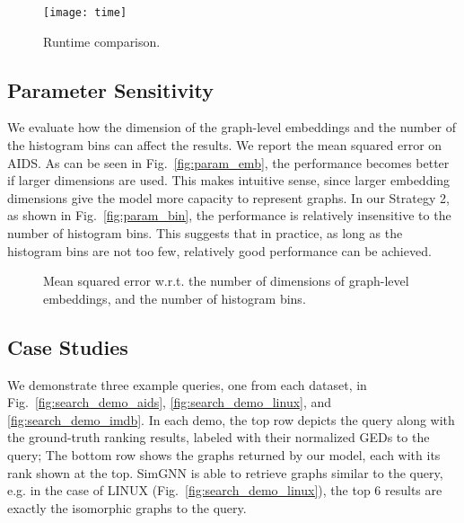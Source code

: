 \documentclass[sigconf]{acmart}
\begin{document}
\begin{figure}
\centering
\texttt{[image: time]}
\vspace{-0.05in}
\caption{Runtime comparison.}
\label{fig:time}
\vspace{-0.05in}
\end{figure}

\subsection{Parameter Sensitivity}

We evaluate how the dimension of the graph-level embeddings and the number of the histogram bins can affect the results. We report the mean squared error on AIDS. As can be seen in Fig.~\ref{fig:param_emb}, the performance becomes better if larger dimensions are used. This makes intuitive sense, since larger embedding dimensions give the model more capacity to represent graphs. In our Strategy 2, as shown in Fig.~\ref{fig:param_bin}, the performance is relatively insensitive to the number of histogram bins. This suggests that in practice, as long as the histogram bins are not too few, relatively good performance can be achieved.

\begin{figure}
    \centering
      \vspace{-0.1in}
    \caption{Mean squared error w.r.t. the number of dimensions of graph-level embeddings, and the number of histogram bins.}
    \vspace{-0.05in}
    \label{fig:param}
\end{figure}

\subsection{Case Studies}

We demonstrate three example queries, one from each dataset, in Fig.~\ref{fig:search_demo_aids}, \ref{fig:search_demo_linux}, and \ref{fig:search_demo_imdb}. In each demo, the top row depicts the query along with the ground-truth ranking results, labeled with their normalized GEDs to the query; The bottom row shows the graphs returned by our model, each with its rank shown at the top. SimGNN is able to retrieve graphs similar to the query, e.g. in the case of LINUX (Fig.~\ref{fig:search_demo_linux}), the top 6 results are exactly the isomorphic graphs to the query.
\end{document}
